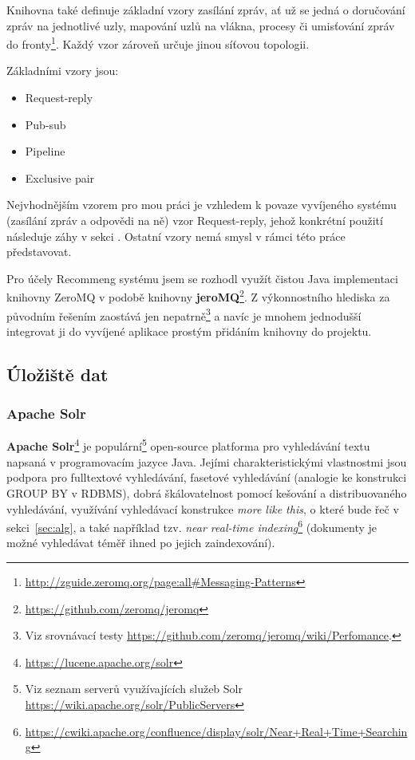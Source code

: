 \documentclass[thesis=M,czech]{FITthesis}[2014/05/07]
\begin{document}
Knihovna také definuje základní vzory zasílání zpráv, ať už se jedná o doručování zpráv na jednotlivé uzly, mapování uzlů na vlákna, procesy či umisťování zpráv do fronty\footnote{\url{http://zguide.zeromq.org/page:all\#Messaging-Patterns}}. Každý vzor zároveň určuje jinou síťovou topologii.

Základními vzory jsou:

\begin{itemize}
	\item Request-reply
	\item Pub-sub
	\item Pipeline		
	\item Exclusive pair
\end{itemize}

Nejvhodnějším vzorem pro mou práci je vzhledem k povaze vyvíjeného systému (zasílání zpráv a odpovědi na ně) vzor Request-reply, jehož konkrétní použití následuje záhy v sekci . Ostatní vzory nemá smysl v rámci této práce představovat.

Pro účely Recommeng systému jsem se rozhodl využít čistou Java implementaci knihovny ZeroMQ v podobě knihovny \textbf{jeroMQ}\footnote{\url{https://github.com/zeromq/jeromq}}. Z výkonnostního hlediska za původním řešením zaostává jen nepatrně\footnote{Viz srovnávací testy \url{https://github.com/zeromq/jeromq/wiki/Perfomance}.} a navíc je mnohem jednodušší integrovat ji do vyvíjené aplikace prostým přidáním knihovny do projektu.

\subsection{Úložiště dat}

\subsubsection{Apache Solr}
\textbf{Apache Solr}\footnote{\url{https://lucene.apache.org/solr}} je populární\footnote{Viz seznam serverů využívajících služeb Solr \url{https://wiki.apache.org/solr/PublicServers}} open-source platforma pro vyhledávání textu napsaná v programovacím jazyce Java. Jejími charakteristickými vlastnostmi jsou podpora pro fulltextové vyhledávání, fasetové vyhledávání (analogie ke konstrukci GROUP BY v RDBMS), dobrá škálovatelnost pomocí kešování a distribuovaného vyhledávání, využívání vyhledávací konstrukce \emph{more like this}, o které bude řeč v sekci~\ref{sec:alg}, a také například tzv. \emph{near real-time indexing}\footnote{\url{https://cwiki.apache.org/confluence/display/solr/Near+Real+Time+Searching}} (dokumenty je možné vyhledávat téměř ihned po jejich zaindexování).
\end{document}
